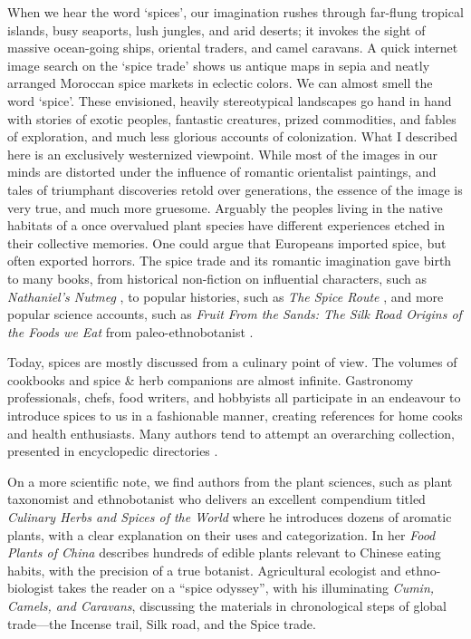When we hear the word `spices', our imagination rushes through far-flung tropical islands, busy seaports, lush jungles, and arid deserts; it invokes the sight of massive ocean-going ships, oriental traders, and camel caravans. A quick internet image search on the `spice trade' shows us antique maps in sepia and neatly arranged Moroccan spice markets in eclectic colors. We can almost smell the word `spice'. These envisioned, heavily stereotypical landscapes go hand in hand with stories of exotic peoples, fantastic creatures, prized commodities, and fables of exploration, and much less glorious accounts of colonization. What I described here is an exclusively westernized viewpoint. While most of the images in our minds are distorted under the influence of romantic orientalist paintings, and tales of triumphant discoveries retold over generations, the essence of the image is very true, and much more gruesome. Arguably the peoples living in the native habitats of a once overvalued plant species have different experiences etched in their collective memories. One could argue that Europeans imported spice, but often exported horrors. The spice trade and its romantic imagination gave birth to many books, from historical non-fiction on influential characters, such as \textit{Nathaniel's Nutmeg} \autocite{milton_nathaniels_1999}, to popular histories, such as \textit{The Spice Route} \autocite{keay_spice_2006}, and more popular science accounts, such as \textit{Fruit From the Sands: The Silk Road Origins of the Foods we Eat} from paleo-ethnobotanist \textcite{spengler_fruit_2019}. 

Today, spices are mostly discussed from a culinary point of view. The volumes of cookbooks and spice \& herb companions are almost infinite. Gastronomy professionals, chefs, food writers, and hobbyists all participate in an endeavour to introduce spices to us in a fashionable manner, creating references for home cooks and health enthusiasts. Many authors tend to attempt an overarching collection, presented in encyclopedic directories \autocite{farrell_spices_1985,craze_spice_1997,herman_herb_2015,norman_herbs_2015,lakshmi_encyclopedia_2016,oconnell_book_2016,opara_culinary_2021}. 

On a more scientific note, we find authors from the plant sciences, such as plant taxonomist and ethnobotanist \textcite{van_wyk_culinary_2014} who delivers an excellent compendium titled \textit{Culinary Herbs and Spices of the World} where he introduces dozens of aromatic plants, with a clear explanation on their uses and categorization. In her \textit{Food Plants of China} \textcite{hu_food_2005} describes hundreds of edible plants relevant to Chinese eating habits, with the precision of a true botanist. Agricultural ecologist and ethno-biologist \textcite{nabhan_cumin_2014} takes the reader on a ``spice odyssey'', with his illuminating \textit{Cumin, Camels, and Caravans}, discussing the materials in chronological steps of global trade---the Incense trail, Silk road, and the Spice trade.

